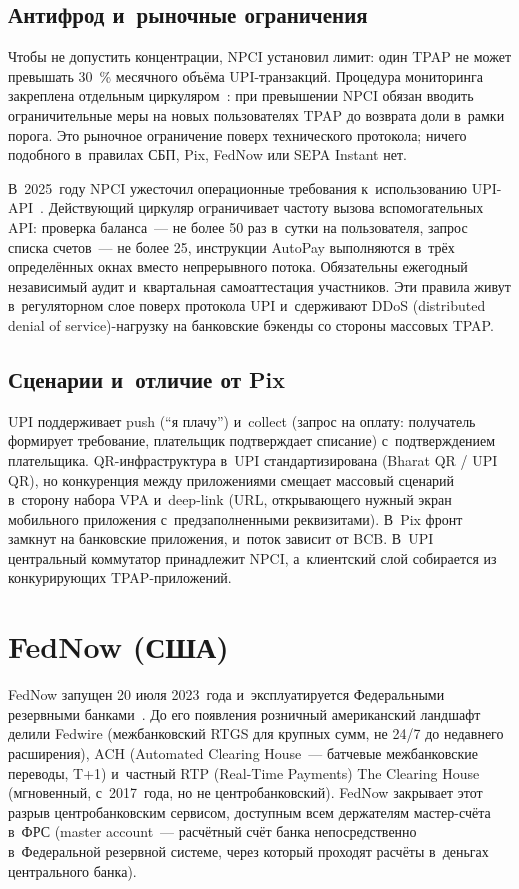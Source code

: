 \subsection*{Антифрод и~рыночные ограничения}\label{subsec:upi-tpap-cap}

Чтобы не допустить концентрации, NPCI установил лимит: один TPAP
не может превышать 30~\% месячного объёма UPI-транзакций. Процедура мониторинга
закреплена отдельным циркуляром~\cite{npci-upi-tpap-cap}: при
превышении NPCI обязан вводить ограничительные меры на новых
пользователях TPAP до возврата доли в~рамки порога. Это рыночное
ограничение поверх технического протокола; ничего подобного в~правилах
СБП, Pix, FedNow или SEPA Instant нет.

В~2025~году NPCI ужесточил операционные требования к~использованию
UPI-API~\cite{npci-upi-oc-215,npci-upi-circulars}. Действующий
циркуляр ограничивает частоту вызова вспомогательных API: проверка
баланса~--- не более 50 раз в~сутки на пользователя, запрос списка
счетов~--- не более 25, инструкции AutoPay выполняются в~трёх
определённых окнах вместо непрерывного потока. Обязательны ежегодный
независимый аудит и~квартальная самоаттестация участников. Эти
правила живут в~регуляторном слое поверх протокола UPI и~сдерживают
DDoS (distributed denial of service)-нагрузку на банковские бэкенды
со стороны массовых TPAP.

\subsection*{Сценарии и~отличие от Pix}\label{subsec:upi-vs-pix}

UPI поддерживает push (\enquote{я плачу}) и~collect (запрос на оплату:
получатель формирует требование, плательщик подтверждает списание) с~подтверждением
плательщика. QR-инфраструктура в~UPI стандартизирована (Bharat QR / UPI QR),
но конкуренция между приложениями смещает массовый сценарий в~сторону набора
VPA и~deep-link (URL, открывающего нужный экран мобильного приложения
с~предзаполненными реквизитами). В~Pix
фронт замкнут на банковские приложения, и~поток зависит от BCB.
В~UPI центральный коммутатор принадлежит NPCI, а~клиентский слой
собирается из конкурирующих TPAP-приложений.

\section{FedNow (США)}\label{sec:fednow-system}

FedNow запущен 20 июля 2023~года и~эксплуатируется Федеральными
резервными банками~\cite{fednow-about,fednow-resources}. До его
появления розничный американский ландшафт делили Fedwire (межбанковский
RTGS для крупных сумм, не 24/7 до недавнего расширения), ACH (Automated
Clearing House~--- батчевые межбанковские переводы, T+1) и~частный
RTP (Real-Time Payments) The Clearing House (мгновенный, с~2017~года,
но не центробанковский). FedNow закрывает этот разрыв центробанковским
сервисом, доступным всем держателям мастер-счёта в~ФРС (master
account~--- расчётный счёт банка непосредственно в~Федеральной
резервной системе, через который проходят расчёты в~деньгах
центрального банка).

